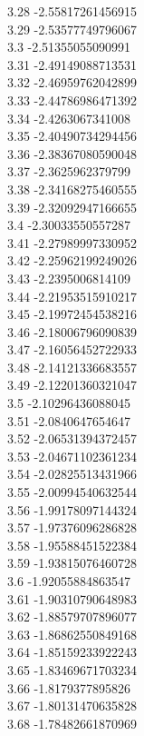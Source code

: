 {3.28	-2.55817261456915\\
3.29	-2.53577749796067\\
3.3	-2.51355055090991\\
3.31	-2.49149088713531\\
3.32	-2.46959762042899\\
3.33	-2.44786986471392\\
3.34	-2.4263067341008\\
3.35	-2.40490734294456\\
3.36	-2.38367080590048\\
3.37	-2.3625962379799\\
3.38	-2.34168275460555\\
3.39	-2.32092947166655\\
3.4	-2.30033550557287\\
3.41	-2.27989997330952\\
3.42	-2.25962199249026\\
3.43	-2.2395006814109\\
3.44	-2.21953515910217\\
3.45	-2.19972454538216\\
3.46	-2.18006796090839\\
3.47	-2.16056452722933\\
3.48	-2.14121336683557\\
3.49	-2.12201360321047\\
3.5	-2.10296436088045\\
3.51	-2.0840647654647\\
3.52	-2.06531394372457\\
3.53	-2.04671102361234\\
3.54	-2.02825513431966\\
3.55	-2.00994540632544\\
3.56	-1.99178097144324\\
3.57	-1.97376096286828\\
3.58	-1.95588451522384\\
3.59	-1.93815076460728\\
3.6	-1.92055884863547\\
3.61	-1.90310790648983\\
3.62	-1.88579707896077\\
3.63	-1.86862550849168\\
3.64	-1.85159233922243\\
3.65	-1.83469671703234\\
3.66	-1.8179377895826\\
3.67	-1.80131470635828\\
3.68	-1.78482661870969\\
}
